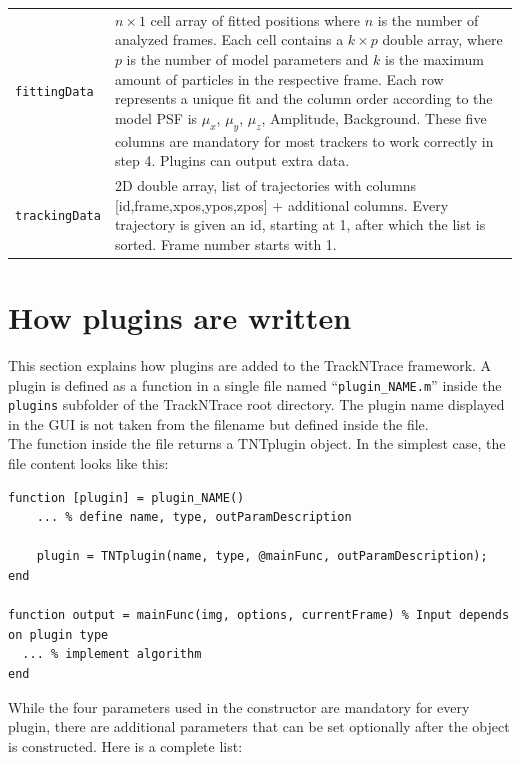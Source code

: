 \documentclass[11pt,onside]{report}
\numberwithin{equation}{chapter}
\begin{document}
\begin{table}[!h]
\begin{tabular}{p{} p{}}
\texttt{fittingData} & $n\times 1$ cell array of fitted positions where $n$ is the number of analyzed frames. Each cell contains a $k\times p$ double array, where $p$ is the number of model parameters and $k$ is the maximum amount of particles in the respective frame. Each row represents a unique fit and the column order according to the model PSF is $\mu_x$, $\mu_y$, $\mu_z$, Amplitude, Background. These five columns are mandatory for most trackers to work correctly in step 4. Plugins can output extra data.\\
\texttt{trackingData} & 2D double array, list of trajectories with columns  [id,frame,xpos,ypos,zpos] + additional columns. Every trajectory is given an id, starting at 1, after which the list is sorted. Frame number starts with 1.\\
\bottomrule
\end{tabular}
\end{table}

\section{How plugins are written}\label{sec:howto_plugins}
This section explains how plugins are added to the TrackNTrace framework. A plugin is defined as a function in a single file named ``\texttt{plugin\_NAME.m}'' inside the \texttt{plugins} subfolder of the TrackNTrace root directory. The plugin name displayed in the GUI is not taken from the filename but defined inside the file.\\

The function inside the file returns a TNTplugin object. In the simplest case, the file content looks like this:
\begin{verbatim}
function [plugin] = plugin_NAME()
    ... % define name, type, outParamDescription

    plugin = TNTplugin(name, type, @mainFunc, outParamDescription);
end

function output = mainFunc(img, options, currentFrame) % Input depends on plugin type
  ... % implement algorithm
end
\end{verbatim}

While the four parameters used in the constructor are mandatory for every plugin, there are additional parameters that can be set optionally after the object is constructed. Here is a complete list:
\end{document}
